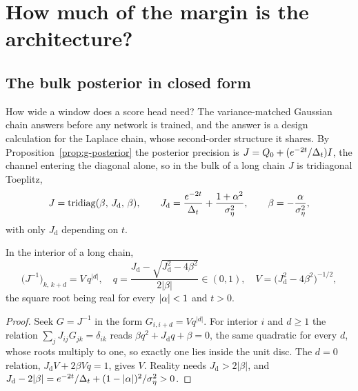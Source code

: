 \section{How much of the margin is the architecture?}\label{sec:em-architecture}

\subsection{The bulk posterior in closed form}\label{sec:em-locality-prediction}

How wide a window does a score head need? The variance-matched Gaussian chain
answers before any network is trained, and the answer is a design
calculation for the Laplace chain, whose second-order structure it shares. By
Proposition~\ref{prop:g-posterior} the posterior precision is
$J = Q_0 + (e^{-2t}/\Delta_t)I$, the channel entering the diagonal alone, so
in the bulk of a long chain $J$ is tridiagonal Toeplitz,
\begin{equation}
  J = \operatorname{tridiag}(\beta,\, J_{\mathrm{d}},\, \beta),
  \qquad
  J_{\mathrm{d}} = \frac{e^{-2t}}{\Delta_t} + \frac{1+\alpha^2}{\sigma_\eta^2},
  \qquad
  \beta = -\frac{\alpha}{\sigma_\eta^2},
  \label{eq:em-bulk-params}
\end{equation}
with only $J_{\mathrm d}$ depending on $t$.

\begin{proposition}\label{prop:em-bulk}
In the interior of a long chain,
\begin{equation}
  \big(J^{-1}\big)_{k,\,k+d} = V\,q^{|d|},
  \quad
  q = \frac{J_{\mathrm{d}} - \sqrt{J_{\mathrm{d}}^2 - 4\beta^2}}{2|\beta|} \in (0,1),
  \quad
  V = \big(J_{\mathrm{d}}^2 - 4\beta^2\big)^{-1/2},
  \label{eq:em-bulk-cov}
\end{equation}
the square root being real for every $|\alpha| < 1$ and $t > 0$.
\end{proposition}

\begin{proof}
Seek $G = J^{-1}$ in the form $G_{i,i+d} = Vq^{|d|}$. For interior $i$ and
$d \ge 1$ the relation $\sum_j J_{ij}G_{jk} = \delta_{ik}$ reads
$\beta q^2 + J_{\mathrm d}q + \beta = 0$, the same quadratic for every $d$,
whose roots multiply to one, so exactly one lies inside the unit disc. The
$d = 0$ relation, $J_{\mathrm d}V + 2\beta Vq = 1$, gives $V$. Reality needs
$J_{\mathrm d} > 2|\beta|$, and
$J_{\mathrm d} - 2|\beta| = e^{-2t}/\Delta_t + (1-|\alpha|)^2/\sigma_\eta^2 > 0$.
\end{proof}

